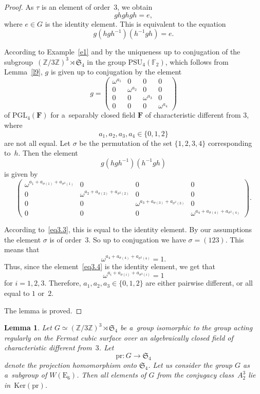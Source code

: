 \documentclass{amsart}
\numberwithin{equation}{section}
\theoremstyle{plain}
\newtheorem{lemma}{Lemma}
\theoremstyle{definition}
\theoremstyle{remark}
\begin{document}
\begin{proof}
As $\tau$ is an element of order~$3$, we obtain
$$
ghghgh=e,
$$
where $e \in G$ is the identity element. This is equivalent to the equation
\begin{equation}
\label{eq3.3}
g(hgh^{-1})(h^{-1}gh)=e.
\end{equation}

According to Example~\ref{e1} and by the uniqueness up to conjugation of the subgroup~\mbox{$(\mathbb{Z}/3\mathbb{Z})^3 \rtimes \mathfrak{S}_4$}
in the group $\mathrm{PSU}_4(\mathbb{F}_2)$, which follows from Lemma~\ref{l9}, $g$ is given up to conjugation by the element
$$
g=\begin{pmatrix}
\omega^{a_1} & 0 & 0 & 0\\
0 & \omega^{a_2} & 0 & 0\\
0 & 0 & \omega^{a_3} & 0\\
0 & 0 & 0 & \omega^{a_4}
\end{pmatrix}
$$ of $\mathrm{PGL}_4(\mathbf{F})$
for a~separably closed field $\mathbf{F}$ of characteristic different from $3$, where
$$
a_1, a_2, a_3, a_4 \in \{0,1,2\}
$$
are not all equal. Let $\sigma$ be the permutation of the set $\{1,2,3,4\}$ corresponding to~$h$. Then the element
$$
g(hgh^{-1})(h^{-1}gh)
$$
is given by
\begin{equation}
\label{eq3.4}
\begin{pmatrix}
\omega^{a_1+a_{\sigma(1)}+a_{\sigma^2(1)}} & 0 & 0 & 0\\
0 & \omega^{a_2+a_{\sigma(2)}+a_{\sigma^2(2)}} & 0 & 0\\
0 & 0 & \omega^{a_3+a_{\sigma(3)}+a_{\sigma^2(3)}} & 0\\
0 & 0 & 0 & \omega^{a_4+a_{\sigma(4)}+a_{\sigma^2(4)}}
\end{pmatrix}.
\end{equation}

According to~\eqref{eq3.3}, this is equal to the identity element. By our assumptions the element $\sigma$ is of order~$3$. So up to conjugation we have $\sigma=(123)$. This means that
$$
 \omega^{a_4+a_{\sigma(4)}+a_{\sigma^2(4)}}=1.
$$ Thus,
since the element~\eqref{eq3.4} is the identity element, we get that
$$
 \omega^{a_i+a_{\sigma(i)}+a_{\sigma^2(i)}}=1
$$
for $i=1,2,3$. Therefore, $a_1, a_2, a_3 \in \{0,1,2\}$ are either pairwise different, or all equal to $1$ or~$2$.

The lemma is proved.
\end{proof}

\begin{lemma}
\label{l17}
Let $G \simeq (\mathbb{Z}/3\mathbb{Z})^3 \rtimes \mathfrak{S}_4$ be a~group isomorphic to the group acting regularly on the Fermat cubic surface over an algebraically closed field of characteristic different from~$3$. Let
$$
\mathrm{pr} \colon G \to \mathfrak{S}_4
$$
denote the projection homomorphism onto $\mathfrak{S}_4$. Let us consider the group $G$ as a~subgroup of $W(\mathrm{E}_6)$. Then all elements of $G$ from the conjugacy class~$A_2^3$ lie in~$\mathrm{Ker}(\mathrm{pr})$.
\end{lemma}
\end{document}

